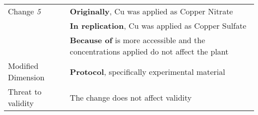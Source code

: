 \begin{table*}[h]
\begin{tabularx}{\textwidth}{
        >{\hsize=0.3\hsize}X
        >{\hsize=0.7\hsize}X}
\hline
    Change \textit{5}   & 
        \textbf{Originally}, Cu was applied as Copper Nitrate \\& \textbf{In replication}, Cu was applied as Copper Sulfate \\
        & \textbf{Because of} is more accessible and the concentrations applied do not affect the plant \\  
 
    Modified Dimension & 
        \textbf{Protocol}, specifically experimental material \\
        
    Threat to validity  & 
        The change does not affect validity  \\  
 
\bottomrule
	\end{tabularx}  

\end{table*}
